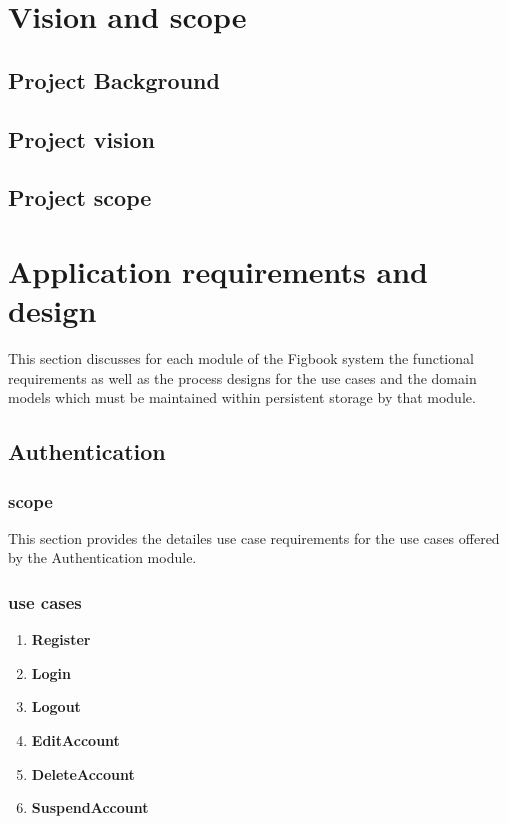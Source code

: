 \documentclass[12pt]{article}
\begin{document}


\newpage
\tableofcontents

\newpage

\section{Vision and scope}

\subsection{Project Background}

\subsection{Project vision}

\subsection{Project scope}

\section{Application requirements and design}
\par{This section discusses for each module of the Figbook system the functional requirements
as well as the process designs for the use cases and the domain models which must be maintained
within persistent storage by that module.
}

\subsection{Authentication}

\subsubsection{scope}
\par{This section provides the detailes use case requirements for the use cases offered by the Authentication
module.}

\subsubsection{use cases}

\begin{enumerate}


\item \bf{Register} 
\item \bf{Login}
\item \bf{Logout}
\item \bf{EditAccount}
\item \bf{DeleteAccount}
\item \bf{SuspendAccount}
\end{enumerate}
\end{document}
